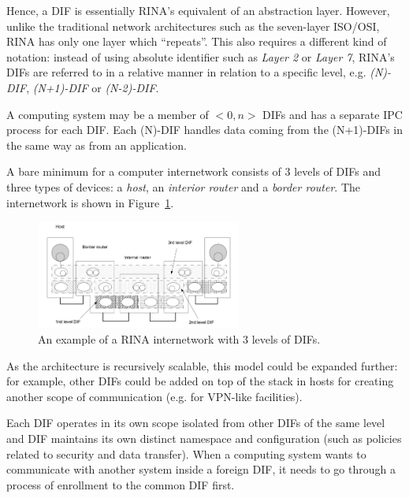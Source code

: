                 Hence, a DIF is essentially RINA's equivalent of an abstraction layer. However, unlike the traditional network architectures such as the seven-layer ISO/OSI, RINA has only one layer which ``repeats''. This also requires a different kind of notation: instead of using absolute identifier such as \emph{Layer 2} or \emph{Layer 7}, RINA's DIFs are referred to in a relative manner in relation to a specific level, e.g. \emph{(N)-DIF}, \emph{(N+1)-DIF} or \emph{(N-2)-DIF}.

                A computing system may be a member of $<0,n>$ DIFs and has a separate IPC process for each DIF. Each (N)-DIF handles data coming from the (N+1)-DIFs in the same way as from an application.

                A bare minimum for a computer internetwork consists of 3 levels of DIFs and three types of devices: a \emph{host}, an \emph{interior router} and a \emph{border router}. The internetwork is shown in Figure~\ref{fig:rina_internetwork}.

                \begin{figure}[H]
                    \begin{center}
                        \includegraphics[width=0.6\textwidth]{fig/archs_rina-net.png}
                      \caption{An example of a RINA internetwork with 3 levels of DIFs.}
                      \label{fig:rina_internetwork}
                    \end{center}
                \end{figure}

                As the architecture is recursively scalable, this model could be expanded further: for example, other DIFs could be added on top of the stack in hosts for creating another scope of communication (e.g. for VPN-like facilities).

                Each DIF operates in its own scope isolated from other DIFs of the same level and DIF maintains its own distinct namespace and configuration (such as policies related to security and data transfer). When a computing system wants to communicate with another system inside a foreign DIF, it needs to go through a process of enrollment to the common DIF first.

